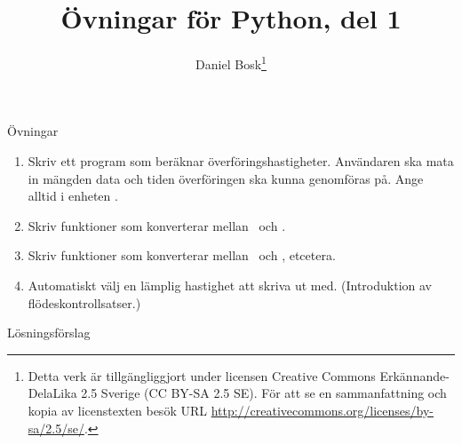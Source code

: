\documentclass[handout]{beamer}
\title{%
  Övningar för Python, del 1
}
\author{Daniel Bosk\footnote{%
  Detta verk är tillgängliggjort under licensen Creative Commons 
  Erkännande-DelaLika 2.5 Sverige (CC BY-SA 2.5 SE).
	För att se en sammanfattning och kopia av licenstexten besök URL 
	\url{http://creativecommons.org/licenses/by-sa/2.5/se/}.
}}
\institute{%
  Avdelningen för informations- och kommunikationssytem (IKS),\\
  Mittuniversitetet, Sundsvall.
}
\date{\svnId}
\begin{document}
\begin{frame}
  \titlepage
\end{frame}

%  

\begin{frame}{Övningar}
  \begin{enumerate}
    \item Skriv ett program som beräknar överföringshastigheter.
      Användaren ska mata in mängden data och tiden överföringen ska kunna 
      genomföras på.
      Ange alltid i enheten \mega\bit\per\second.

    \item Skriv funktioner som konverterar mellan \mega\bit\per\second\ och 
      \mebi\bit\per\second.

    \item Skriv funktioner som konverterar mellan \mega\bit\per\second\ och 
      \bit\per\second, etcetera.

    \item Automatiskt välj en lämplig hastighet att skriva ut med.
      (Introduktion av flödeskontrollsatser.)
  \end{enumerate}
\end{frame}

\begin{frame}{Lösningsförslag}
  
\end{frame}



%  
\end{document}
